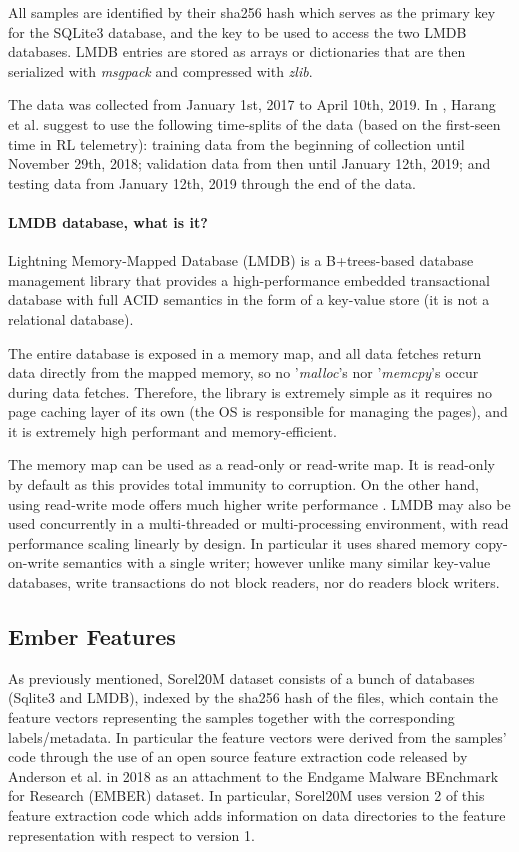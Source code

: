 \documentclass[pdfa%
,cucitura%
]{toptesi}
\begin{document}
All samples are identified by their sha256 hash which serves as the primary key for the SQLite3 database, and the key to be used to access the two LMDB databases. LMDB entries are stored as arrays or dictionaries that are then serialized with \textit{msgpack} and compressed with \textit{zlib}.

The data was collected from January 1st, 2017 to April 10th, 2019. In \cite{HarangSOREL20M}, Harang et al. suggest to use the following time-splits of the data (based on the first-seen time in RL telemetry): training data from the beginning of collection until November 29th, 2018; validation data from then until January 12th, 2019; and testing data from January 12th, 2019 through the end of the data.

\paragraph{LMDB database, what is it?}
Lightning Memory-Mapped Database (LMDB) is a B+trees-based database management library that provides a high-performance embedded transactional database with full ACID semantics in the form of a key-value store (it is not a relational database).

The entire database is exposed in a memory map, and all data fetches return data directly from the mapped memory, so no '\textit{malloc}'s nor '\textit{memcpy}'s occur during data fetches. Therefore, the library is extremely simple as it requires no page caching layer of its own (the OS is responsible for managing the pages), and it is extremely high performant and memory-efficient.

The memory map can be used as a read-only or read-write map. It is read-only by default as this provides total immunity to corruption. On the other hand, using read-write mode offers much higher write performance \cite{ChuLMDBDoc}. LMDB may also be used concurrently in a multi-threaded or multi-processing environment, with read performance scaling linearly by design. In particular it uses shared memory copy-on-write semantics with a single writer; however unlike many similar key-value databases, write transactions do not block readers, nor do readers block writers.

\subsection{Ember Features}
As previously mentioned, Sorel20M dataset consists of a bunch of databases (Sqlite3 and LMDB), indexed by the sha256 hash of the files, which contain the feature vectors representing the samples together with the corresponding labels/metadata. In particular the feature vectors were derived from the samples' code through the use of an open source feature extraction code released by Anderson et al. \cite{AndersonEMBER} in 2018 as an attachment to the Endgame Malware BEnchmark for Research (EMBER) dataset. In particular, Sorel20M uses version 2 of this feature extraction code which adds information on data directories to the feature representation with respect to version 1.
\end{document}

